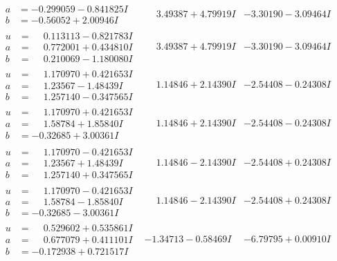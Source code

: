 \documentclass[1p]{elsarticle_modified}
\theoremstyle{definition}
\begin{document}
$$\begin{array}{c|c|c}
\begin{aligned}
a &= -0.299059 - 0.841825 I \\
b &= -0.56052 + 2.00946 I\end{aligned}
 & \phantom{-}3.49387 + 4.79919 I & -3.30190 - 3.09464 I \\ \hline\begin{aligned}
u &= \phantom{-}0.113113 - 0.821783 I \\
a &= \phantom{-}0.772001 + 0.434810 I \\
b &= \phantom{-}0.210069 - 1.180080 I\end{aligned}
 & \phantom{-}3.49387 + 4.79919 I & -3.30190 - 3.09464 I \\ \hline\begin{aligned}
u &= \phantom{-}1.170970 + 0.421653 I \\
a &= \phantom{-}1.23567 - 1.48439 I \\
b &= \phantom{-}1.257140 - 0.347565 I\end{aligned}
 & \phantom{-}1.14846 + 2.14390 I & -2.54408 - 0.24308 I \\ \hline\begin{aligned}
u &= \phantom{-}1.170970 + 0.421653 I \\
a &= \phantom{-}1.58784 + 1.85840 I \\
b &= -0.32685 + 3.00361 I\end{aligned}
 & \phantom{-}1.14846 + 2.14390 I & -2.54408 - 0.24308 I \\ \hline\begin{aligned}
u &= \phantom{-}1.170970 - 0.421653 I \\
a &= \phantom{-}1.23567 + 1.48439 I \\
b &= \phantom{-}1.257140 + 0.347565 I\end{aligned}
 & \phantom{-}1.14846 - 2.14390 I & -2.54408 + 0.24308 I \\ \hline\begin{aligned}
u &= \phantom{-}1.170970 - 0.421653 I \\
a &= \phantom{-}1.58784 - 1.85840 I \\
b &= -0.32685 - 3.00361 I\end{aligned}
 & \phantom{-}1.14846 - 2.14390 I & -2.54408 + 0.24308 I \\ \hline\begin{aligned}
u &= \phantom{-}0.529602 + 0.535861 I \\
a &= \phantom{-}0.677079 + 0.411101 I \\
b &= -0.172938 + 0.721517 I\end{aligned}
 & -1.34713 - 0.58469 I & -6.79795 + 0.00910 I \\ \hline\begin{aligned}

\end{aligned}
\end{array}$$
\end{document}
